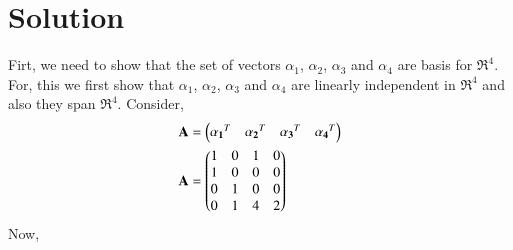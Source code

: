 \documentclass[journal,12pt,twocolumn]{IEEEtran}
\begin{document}
\section{Solution}
Firt, we need to show that the set of vectors $\alpha_1$, $\alpha_2$, $\alpha_3$ and $\alpha_4$ are basis for $\Re^4$. For, this we first show that $\alpha_1$, $\alpha_2$, $\alpha_3$ and $\alpha_4$ are linearly independent in $\Re^4$ and also they span $\Re^4$. Consider,
\begin{align}
& \mathbf{A} = \begin{pmatrix}\mathbf{\alpha_1}^T & \mathbf{\alpha_2}^T & \mathbf{\alpha_3}^T & \mathbf{\alpha_4}^T \end{pmatrix} \\
& \mathbf{A} = \begin{pmatrix}1 & 0 & 1 & 0 \\ 1 & 0 & 0 & 0 \\ 0 & 1 & 0 & 0 \\ 0 & 1 & 4 & 2\end{pmatrix}
\end{align}
Now,
\end{document}
